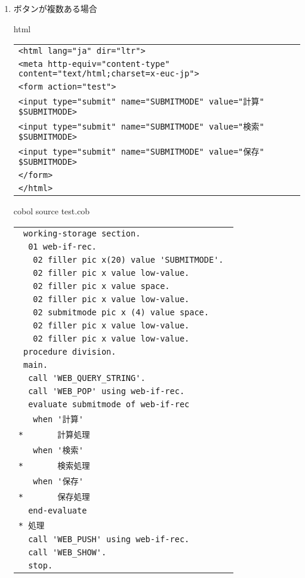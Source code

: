 \begin{itemize}
\begin{enumerate}
 \item{ボタンが複数ある場合}

   {\gt html}

   \begin{tabular}{|l|}
   \hline
   \verb+<html lang="ja" dir="ltr">+\\
   \verb+<meta http-equiv="content-type" content="text/html;charset=x-euc-jp">+\\
   \verb+<form action="test">+\\
   \verb+<input type="submit" name="SUBMITMODE" value="計算" $SUBMITMODE>+\\
   \verb+<input type="submit" name="SUBMITMODE" value="検索" $SUBMITMODE>+\\
   \verb+<input type="submit" name="SUBMITMODE" value="保存" $SUBMITMODE>+\\
   \verb+</form>+\\
   \verb+</html>+\\
   \hline
   \end{tabular}

   {\gt cobol} source test.cob

   \begin{tabular}{|l|}
   \hline
   \verb+ working-storage section.+\\
   \verb+  01 web-if-rec.+\\
   \verb+   02 filler pic x(20) value 'SUBMITMODE'. +\\
   \verb+   02 filler pic x value low-value.+\\
   \verb+   02 filler pic x value space.+\\
   \verb+   02 filler pic x value low-value.+\\
   \verb+   02 submitmode pic x (4) value space.+\\
   \verb+   02 filler pic x value low-value.+\\
   \verb+   02 filler pic x value low-value.+\\
   \verb+ procedure division.+\\
   \verb+ main.+\\
   \verb+  call 'WEB_QUERY_STRING'.+\\
   \verb+  call 'WEB_POP' using web-if-rec.+\\
   \verb+  evaluate submitmode of web-if-rec+\\
   \verb+   when '計算'+\\
   \verb+*       計算処理+\\
   \verb+   when '検索'+\\
   \verb+*       検索処理+\\
   \verb+   when '保存'+\\
   \verb+*       保存処理+\\
   \verb+  end-evaluate+\\
   \verb+* 処理+\\
   \verb+  call 'WEB_PUSH' using web-if-rec.+\\
   \verb+  call 'WEB_SHOW'.+\\
   \verb+  stop.+\\
   \hline
   \end{tabular}


\end{enumerate}
\end{itemize}
